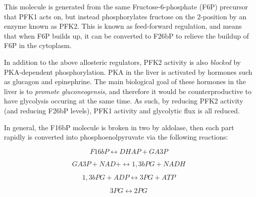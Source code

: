 \documentclass{tufte-handout}
\begin{document}
  This molecule is generated from the same Fructose-6-phosphate (F6P) precursor that PFK1 acts on, but instead phosphorylates fructose on the 2-position by an enzyme known as PFK2.  This is known as feed-forward regulation, and means that when F6P builds up, it can be converted to F26bP to relieve the buildup of F6P in the cytoplasm.

  In addition to the above allosteric regulators, PFK2 activity is also \emph{blocked} by PKA-dependent phosphorylation.  PKA in the liver is activated by hormones such as glucagon and epinephrine.  The main biological goal of these hormones in the liver is to \emph{promote gluconeogensis}, and therefore it would be counterproductive to have glycolysis occuring at the same time.  As such, by reducing PFK2 activity (and reducing F26bP levels), PFK1 activity and glycolytic flux is all reduced.

  In general, the F16bP molecule is broken in two by aldolase, then each part rapidly is converted into phosphoenolpyruvate via the following reactions:

\begin{equation}\label{eq:aldolase-a}
F16bP \leftrightarrow DHAP+ GA3P
\end{equation}

\begin{equation}
GA3P + NAD+ \leftrightarrow 1,3bPG  + NADH
\end{equation}

\begin{equation}\label{eq:pgk}
1,3bPG + ADP \leftrightarrow 3PG + ATP
\end{equation}

\begin{equation}
3PG \leftrightarrow 2PG
\end{equation}
\end{document}
